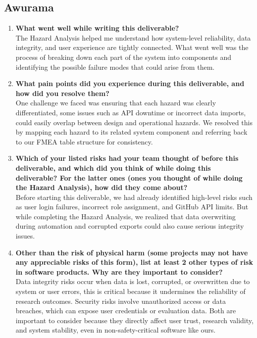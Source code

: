 \documentclass{article}
\begin{document}
\subsection*{Awurama}
\begin{enumerate}
    \item \textbf{What went well while writing this deliverable?}\\
    The Hazard Analysis helped me understand how system-level reliability, data integrity, and user experience are tightly connected. What went well was the process of breaking down each part of the system into components and identifying the possible failure modes that could arise from them. 
    \item \textbf{What pain points did you experience during this deliverable, and how
    did you resolve them?}\\
    One challenge we faced was ensuring that each hazard was clearly differentiated, some issues such as API downtime or incorrect data imports, could easily overlap between design and operational hazards. We resolved this by mapping each hazard to its related system component and referring back to our FMEA table structure for consistency.
    \item \textbf{Which of your listed risks had your team thought of before this
    deliverable, and which did you think of while doing this deliverable? For
    the latter ones (ones you thought of while doing the Hazard Analysis), how
    did they come about?}\\
    Before starting this deliverable, we had already identified high-level risks such as user login failures, incorrect role assignment, and GitHub API limits. But while completing the Hazard Analysis, we realized that data overwriting during automation and corrupted exports could also cause serious integrity issues. 
    \item \textbf{Other than the risk of physical harm (some projects may not have any
    appreciable risks of this form), list at least 2 other types of risk in
    software products. Why are they important to consider?} \\
    Data integrity risks occur when data is lost, corrupted, or overwritten due to system or user errors, this is critical because it undermines the reliability of research outcomes. Security risks involve unauthorized access or data breaches, which can expose user credentials or evaluation data. Both are important to consider because they directly affect user trust, research validity, and system stability, even in non-safety-critical software like ours.\\
  \end{enumerate}
\end{document}
